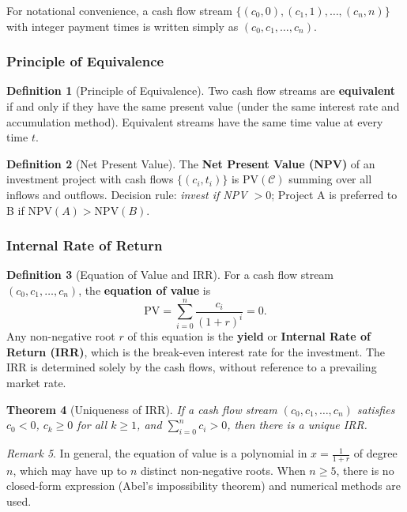 \documentclass[12pt, a4paper]{article}
\theoremstyle{plain}
\newtheorem{theorem}{Theorem}[section]
\theoremstyle{definition}
\newtheorem{definition}[theorem]{Definition}
\theoremstyle{remark}
\newtheorem{remark}[theorem]{Remark}
\newenvironment{sidenote}{%
  \par\vspace{0.5em}%
  \noindent\color{defcolor}%
}{%
  \par\vspace{0.5em}%
  \color{black}%
}
\begin{document}
\begin{sidenote}
  For notational convenience, a cash flow stream $\{(c_0, 0), (c_1, 1), \ldots, (c_n, n)\}$ with integer payment times is written simply as $(c_0, c_1, \ldots, c_n)$.
\end{sidenote}

\subsubsection{Principle of Equivalence}

\begin{definition}[Principle of Equivalence]
  Two cash flow streams are \textbf{equivalent} if and only if they have the same present value (under the same interest rate and accumulation method). Equivalent streams have the same time value at every time $t$.
\end{definition}

\begin{definition}[Net Present Value]
  The \textbf{Net Present Value (NPV)} of an investment project with cash flows $\{(c_i, t_i)\}$ is $\mathrm{PV}(\mathcal{C})$ summing over all inflows and outflows. Decision rule: \emph{invest if NPV $> 0$}; Project A is preferred to B if $\mathrm{NPV}(A) > \mathrm{NPV}(B)$.
\end{definition}

\subsubsection{Internal Rate of Return}

\begin{definition}[Equation of Value and IRR]
  For a cash flow stream $(c_0, c_1, \ldots, c_n)$, the \textbf{equation of value} is
  \[
    \mathrm{PV} = \sum_{i=0}^n \frac{c_i}{(1+r)^i} = 0.
  \]
  Any non-negative root $r$ of this equation is the \textbf{yield} or \textbf{Internal Rate of Return (IRR)}, which is the break-even interest rate for the investment. The IRR is determined solely by the cash flows, without reference to a prevailing market rate.
\end{definition}

\begin{theorem}[Uniqueness of IRR]
  If a cash flow stream $(c_0, c_1, \ldots, c_n)$ satisfies $c_0 < 0$, $c_k \geq 0$ for all $k \geq 1$, and $\sum_{i=0}^n c_i > 0$, then there is a unique IRR.
\end{theorem}

\begin{remark}
  In general, the equation of value is a polynomial in $x = \frac{1}{1+r}$ of degree $n$, which may have up to $n$ distinct non-negative roots. When $n \geq 5$, there is no closed-form expression (Abel's impossibility theorem) and numerical methods are used.
\end{remark}
\end{document}

